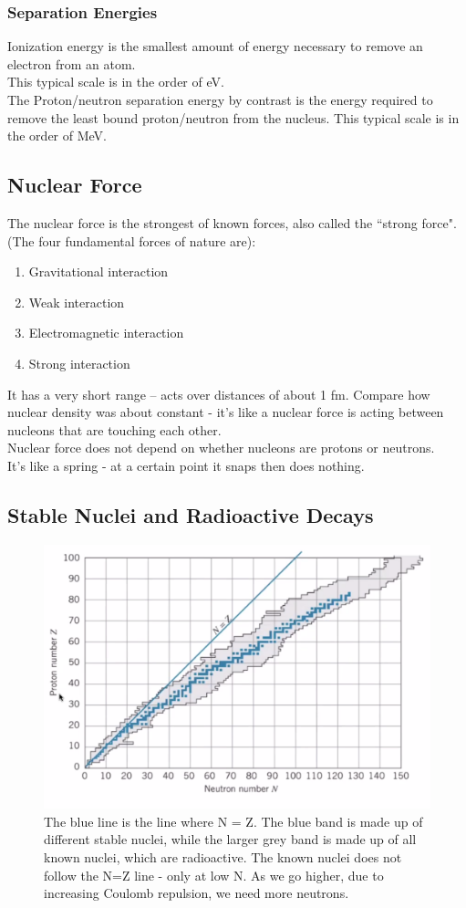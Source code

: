\documentclass[class=article,crop=false]{standalone}
\begin{document}
\subsubsection{Separation Energies}
Ionization energy is the smallest amount of energy necessary to remove an electron from an atom. \\
This typical scale is in the order of eV. \\
The Proton/neutron separation energy by contrast is the energy required to remove the least bound proton/neutron from the nucleus.
This typical scale is in the order of MeV. \\

\subsection{Nuclear Force}
The nuclear force is the strongest of known forces, also called the ``strong force". (The four fundamental forces of nature are):
\begin{enumerate}
	\item Gravitational interaction
	\item Weak interaction
	\item Electromagnetic interaction
	\item Strong interaction
\end{enumerate}

It has a very short range -- acts over distances of about 1 fm. Compare how nuclear density was about constant - it's like a nuclear force is acting between nucleons that are touching each other. \\

Nuclear force does not depend on whether nucleons are protons or neutrons. \\

It's like a spring - at a certain point it snaps then does nothing.

\subsection{Stable Nuclei and Radioactive Decays}

\begin{figure}[h!]
	\centering
	\includegraphics[width=.6\linewidth]{./Images/stable.png}
	\caption{The blue line is the line where N = Z. The blue band is made up of different stable nuclei, while the larger grey band is made up of all known nuclei, which are radioactive. The known nuclei does not follow the N=Z line - only at low N. As we go higher, due to increasing Coulomb repulsion, we need more neutrons.}
\end{figure}
\end{document}
